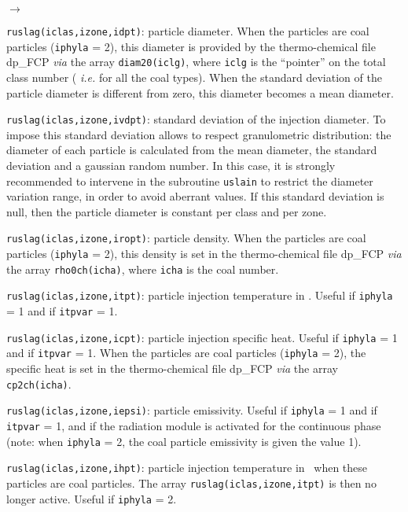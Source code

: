 {{{\begin{list}{$\rightarrow$}{}
\item \texttt{ruslag(iclas,izone,idpt)}: particle diameter. When the particles
      are coal particles (\texttt{iphyla} = 2), this diameter is provided by the
      thermo-chemical file dp\_FCP {\it via} the array \texttt{diam20(iclg)},
      where \texttt{iclg} is the ``pointer'' on the total class number ({\em
      i.e.} for all the coal types). When the standard deviation of the
      particle diameter is different from zero, this diameter becomes a
      mean diameter.

\item \texttt{ruslag(iclas,izone,ivdpt)}: standard deviation of the injection
      diameter. To impose this standard deviation allows to respect
      granulometric distribution: the diameter of each particle is
      calculated from the mean diameter, the standard deviation and a
      gaussian random number. In this case, it is strongly recommended
      to intervene in the subroutine \texttt{uslain} to
      restrict the diameter variation range, in order to avoid
      aberrant values. If this standard deviation is null, then the
      particle diameter is constant per class and per zone.

\item \texttt{ruslag(iclas,izone,iropt)}: particle density. When the particles
      are coal particles (\texttt{iphyla} = 2), this density is set in the
      thermo-chemical file dp\_FCP {\em via} the array \texttt{rho0ch(icha)},
      where \texttt{icha} is the coal number.

\item \texttt{ruslag(iclas,izone,itpt)}: particle injection temperature in
      \degresC. Useful if \texttt{iphyla} = 1 and if \texttt{itpvar} = 1.

\item \texttt{ruslag(iclas,izone,icpt)}: particle injection specific heat. Useful
      if \texttt{iphyla} = 1 and if \texttt{itpvar} = 1. When the particles are coal
      particles (\texttt{iphyla} = 2), the specific heat is set in the
      thermo-chemical file dp\_FCP {\em via} the array \texttt{cp2ch(icha)}.

\item \texttt{ruslag(iclas,izone,iepsi)}: particle emissivity. Useful if
      \texttt{iphyla} = 1 and if \texttt{itpvar} = 1, and if the radiation
      module is activated for the continuous phase (note: when \texttt{iphyla} = 2,
      the coal particle emissivity is given the value 1).

\item \texttt{ruslag(iclas,izone,ihpt)}: particle injection temperature in
      \degresC\ when these particles are coal
      particles. The array \texttt{ruslag(iclas,izone,itpt)} is then no longer
      active. Useful if \texttt{iphyla} = 2.


\end{list}}}}

